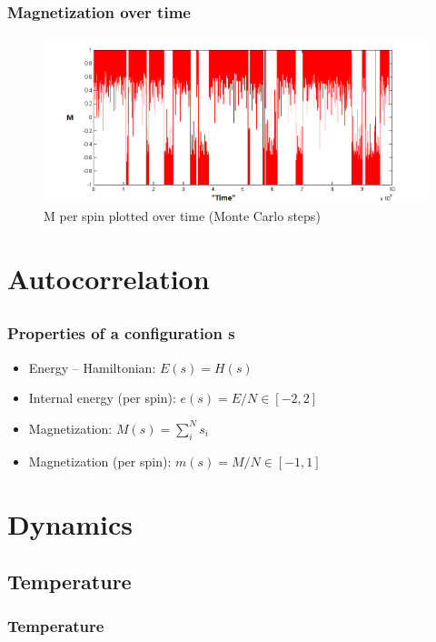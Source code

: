 \documentclass{beamer}
\begin{document}
\begin{frame}
\frametitle{Magnetization over time}
\begin{figure}[h]\begin{center}\includegraphics[width = \textwidth]{./img/MPlot.png}\end{center}\caption{M per spin plotted over time (Monte Carlo steps)}\end{figure}
\end{frame}


\section{Autocorrelation}
\subsection{}






\begin{frame}\frametitle{Properties of a configuration s}
\begin{itemize}
\item Energy -- Hamiltonian: $E(s) = H(s)$
\item  Internal energy (per spin): $e(s) = E/N \in [ -2,2]$
\item Magnetization: $M(s) = \sum_i^N s_i$
\item Magnetization (per spin): $m(s) = M/N\in [ -1,1]$
\end{itemize}
\end{frame}



\section{Dynamics}
\subsection{Temperature}
\begin{frame}\frametitle{Temperature}
\end{frame}
\end{document}
